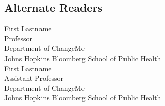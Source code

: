 \subsection*{Alternate Readers}

\begin{singlespace}


\indent First Lastname  \\
\indent \indent Professor\\
\indent \indent Department of ChangeMe\\
\indent \indent  Johns Hopkins Bloomberg School of Public Health \\

\noindent First Lastname  \\
\indent \indent Assistant Professor\\
\indent \indent Department of ChangeMe\\
\indent \indent  Johns Hopkins Bloomberg School of Public Health \\




\end{singlespace}
















